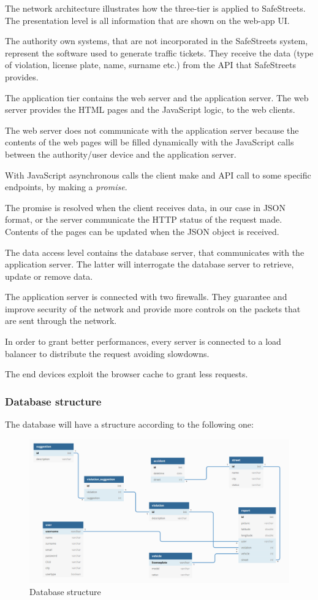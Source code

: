 The network architecture illustrates how the three-tier is applied to SafeStreets. The presentation level is all information that are shown on the web-app UI.

The authority own systems, that are not incorporated in the SafeStreets system, represent the software used to generate traffic tickets. They receive the data (type of violation, license plate, name, surname etc.) from the API that SafeStreets provides.

The application tier contains the web server and the application server. The web server provides the HTML pages and the JavaScript logic, to the web clients. 

The web server does not communicate with the application server because the contents of the web pages will be filled dynamically with the JavaScript calls between the authority/user device and the application server. 

With JavaScript asynchronous calls the client make and API call to some specific endpoints, by making a \textit{promise}.

The promise is resolved when the client receives data, in our case in JSON format, or the server communicate the HTTP status of the request made.
Contents of the pages can be updated when the JSON object is received.

The data access level contains the database server, that communicates with the application server.
The latter will interrogate the database server to retrieve, update or remove data.

The application server is connected with two firewalls.
They guarantee and improve security of the network and provide more controls on the packets that are sent through the network.

In order to grant better performances, every server is connected to a load balancer to distribute the request avoiding slowdowns.

The end devices exploit the browser cache to grant less requests.

\subsubsection{Database structure}
The database will have a structure according to the following one: 

\begin{figure}[H]
	\includegraphics[width=0.95\linewidth, height=0.50\textheight]{../DD/Images/ER}
	\caption{Database structure}
	\label{Database structure}
\end{figure}


